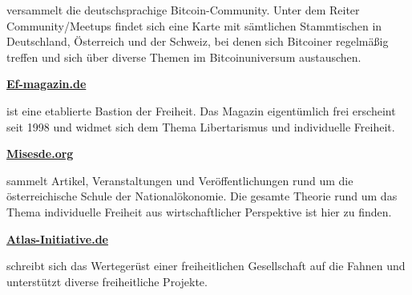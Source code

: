\documentclass[
  a5paper,
  smalldemyvopaper,10pt,twoside,onecolumn,openright,extrafontsizes,hidelinks]{memoir}
\begin{document}
\vspace{1em}

versammelt die deutschsprachige Bitcoin-Community. Unter dem Reiter
Community/Meetups findet sich eine Karte mit sämtlichen Stammtischen in
Deutschland, Österreich und der Schweiz, bei denen sich Bitcoiner
regelmäßig treffen und sich über diverse Themen im Bitcoinuniversum
austauschen.

\vspace{1em}

\href{https://Ef-magazin.de}{\textbf{Ef-magazin.de}}

\vspace{1em}

ist eine etablierte Bastion der Freiheit. Das Magazin eigentümlich frei
erscheint seit 1998 und widmet sich dem Thema Libertarismus und
individuelle Freiheit.

\vspace{1em}

\href{https://Misesde.org}{\textbf{Misesde.org}}

\vspace{1em}

sammelt Artikel, Veranstaltungen und Veröffentlichungen rund um die
österreichische Schule der Nationalökonomie. Die gesamte Theorie rund um
das Thema individuelle Freiheit aus wirtschaftlicher Perspektive ist
hier zu finden.

\vspace{1em}

\href{https://Atlas-Initiative.de}{\textbf{Atlas-Initiative.de}}

\vspace{1em}

schreibt sich das Wertegerüst einer freiheitlichen Gesellschaft auf die
Fahnen und unterstützt diverse freiheitliche Projekte.


\backmatter
\end{document}
